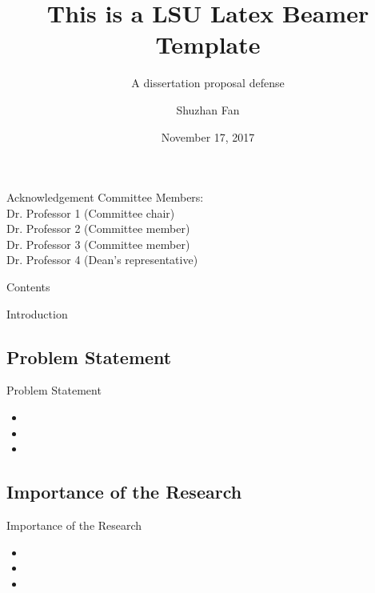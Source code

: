 \documentclass{beamer}
\title{This is a LSU Latex Beamer Template}
\subtitle{A dissertation proposal defense}
\author{Shuzhan Fan}
\institute{Louisiana State University}
\date{November 17, 2017}
\begin{document}
\frame{\titlepage}

\begin{frame}{Acknowledgement}
    Committee Members: \\
    \vspace{1ex}
    Dr. Professor 1 (Committee chair)\\
    Dr. Professor 2 (Committee member)\\
    Dr. Professor 3 (Committee member)\\
    Dr. Professor 4 (Dean's representative)
\end{frame}

\begin{frame}{Contents}
    \tableofcontents[hidesubsections]
\end{frame}

\begin{section}{Introduction}                   %
    \subsection{Problem Statement}              %
    \begin{frame}{Problem Statement}
        \begin{itemize}
            \item
            \item
            \item
        \end{itemize}
    \end{frame}

    \subsection{Importance of the Research}     %
    \begin{frame}{Importance of the Research}
        \begin{itemize}
            \item
            \item
            \item
        \end{itemize}
    \end{frame}
    \end{section}
\end{document}
